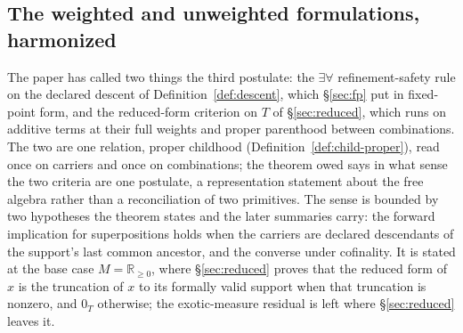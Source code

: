 \subsection{The weighted and unweighted formulations, harmonized}
\label{sec:harmonize}
The paper has called two things the third postulate: the $\exists\forall$ refinement-safety rule on the declared descent of Definition~\ref{def:descent}, which §\ref{sec:fp} put in fixed-point form, and the reduced-form criterion on $T$ of §\ref{sec:reduced}, which runs on additive terms at their full weights and proper parenthood between combinations. The two are one relation, proper childhood (Definition~\ref{def:child-proper}), read once on carriers and once on combinations; the theorem owed says in what sense the two criteria are one postulate, a representation statement about the free algebra rather than a reconciliation of two primitives. The sense is bounded by two hypotheses the theorem states and the later summaries carry: the forward implication for superpositions holds when the carriers are declared descendants of the support's last common ancestor, and the converse under cofinality. It is stated at the base case $M = \mathbb{R}_{\ge 0}$, where §\ref{sec:reduced} proves that the reduced form of $x$ is the truncation of $x$ to its formally valid support when that truncation is nonzero, and $0_T$ otherwise; the exotic-measure residual is left where §\ref{sec:reduced} leaves it.

